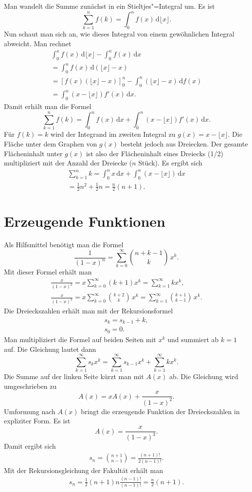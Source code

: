\documentclass[a4paper,10pt,fleqn,twocolumn,twoside]{scrartcl}
\begin{document}
Man wandelt die Summe zunächst in ein Stieltjes"=Integral um. Es ist
\[\sum_{k=1}^n f(k) = \int_0^n f(x)\,\mathrm d\lfloor x\rfloor.\]
Nun schaut man sich an, wie dieses Integral von einem gewöhnlichen
Integral abweicht. Man rechnet%
\begin{gather*}
\int_0^x f(x)\,\mathrm d\lfloor x\rfloor - \int_0^n f(x)\,\mathrm dx\\
= \int_0^n f(x)\,\mathrm d(\lfloor x\rfloor-x)\\
= [f(x)(\lfloor x\rfloor-x)]_0^n
- \int_0^n (\lfloor x\rfloor -x)\,\mathrm df(x)\\
= \int_0^n (x-\lfloor x\rfloor)f'(x)\,\mathrm dx.
\end{gather*}
Damit erhält man die Formel
\[\sum_{k=1}^n f(k) = \int_0^n f(x)\,\mathrm dx
+\int_0^n (x-\lfloor x\rfloor)f'(x)\,\mathrm dx.\]
Für $f(k)=k$ wird der Integrand im zweiten Integral zu
$g(x)=x-\lfloor x\rfloor$. Die Fläche unter dem Graphen von $g(x)$
besteht jedoch aus Dreiecken. Der gesamte Flächeninhalt unter $g(x)$
ist also der Flächeninhalt eines Dreiecks (1/2) multipliziert
mit der Anzahl der Dreiecke ($n$ Stück). Es ergibt sich%
\begin{gather*}
\sum_{k=1}^n k = \int_0^n x\,\mathrm dx
+\int_0^n (x-\lfloor x\rfloor)\,\mathrm dx\\
= \frac{1}{2}n^2 + \frac{1}{2}n = \frac{n}{2}(n+1).
\end{gather*}

\section{Erzeugende Funktionen}

Als Hilfsmittel benötigt man die Formel%
\[\frac{1}{(1-x)^n} = \sum_{k=0}^{\infty} \binom{n+k-1}{k}\,x^k.\]
Mit dieser Formel erhält man
\begin{gather*}
\frac{x}{(1-x)^2} = x\sum_{k=0}^{\infty} (k+1)x^k
= \sum_{k=1}^{\infty} kx^k,\\
\frac{x}{(1-x)^3} = x\sum_{k=0}^{\infty} \binom{k+2}{k}\,x^k
= \sum_{k=1}^{\infty} \binom{k+1}{k-1}\,x^k.
\end{gather*}
Die Dreieckszahlen erhält man mit der Rekursionsformel%
\begin{gather*}
s_k=s_{k-1}+k,\\
s_0=0.
\end{gather*}
Man multipliziert die Formel auf beiden Seiten mit $x^k$
und summiert ab $k=1$ auf. Die Gleichung lautet dann%
\[\sum_{k=1}^{\infty} s_k x^k
= \sum_{k=1}^{\infty} s_{k-1}x^k + \sum_{k=1}^{\infty} kx^k.\]
Die Summe auf der linken Seite kürzt man mit $A(x)$ ab.
Die Gleichung wird umgeschrieben zu%
\[A(x) = xA(x) + \frac{x}{(1-x)^2}.\]
Umformung nach $A(x)$ bringt die erzeugende Funktion der
Dreieckszahlen in expliziter Form. Es ist%
\[A(x) = \frac{x}{(1-x)^3}.\]
Damit ergibt sich
\begin{gather*}
s_n = \binom{n+1}{n-1} = \frac{(n+1)!}{2(n-1)!}.
\end{gather*}
Mit der Rekursionsgleichung der Fakultät erhält man%
\begin{gather*}
s_n = \frac{1}{2}(n+1)n\frac{(n-1)!}{(n-1)!}
= \frac{n}{2}(n+1).
\end{gather*}
\end{document}

